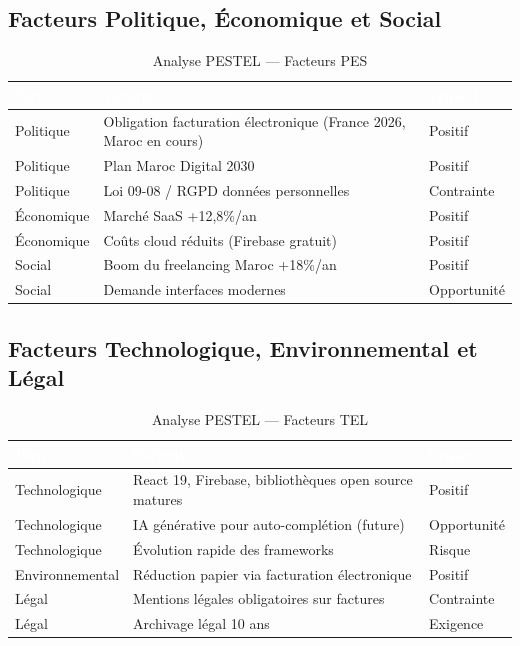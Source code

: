 \subsection{Facteurs Politique, Économique et Social}

\begin{table}[H]
\centering
\caption{Analyse PESTEL — Facteurs PES}
\label{tab:pestel_pes}
\begin{tabularx}{\textwidth}{|l|X|l|}
\hline
\rowcolor{emsiblue}\textcolor{white}{\textbf{Dim.}} & \textcolor{white}{\textbf{Facteur}} & \textcolor{white}{\textbf{Impact}} \\
\hline
Politique & Obligation facturation électronique (France 2026, Maroc en cours) & Positif \\
Politique & Plan Maroc Digital 2030 & Positif \\
Politique & Loi 09-08 / RGPD données personnelles & Contrainte \\
Économique & Marché SaaS +12,8\%/an & Positif \\
Économique & Coûts cloud réduits (Firebase gratuit) & Positif \\
Social & Boom du freelancing Maroc +18\%/an & Positif \\
Social & Demande interfaces modernes & Opportunité \\
\hline
\end{tabularx}
\end{table}

\subsection{Facteurs Technologique, Environnemental et Légal}

\begin{table}[H]
\centering
\caption{Analyse PESTEL — Facteurs TEL}
\label{tab:pestel_tel}
\begin{tabularx}{\textwidth}{|l|X|l|}
\hline
\rowcolor{emsiblue}\textcolor{white}{\textbf{Dim.}} & \textcolor{white}{\textbf{Facteur}} & \textcolor{white}{\textbf{Impact}} \\
\hline
Technologique & React 19, Firebase, bibliothèques open source matures & Positif \\
Technologique & IA générative pour auto-complétion (future) & Opportunité \\
Technologique & Évolution rapide des frameworks & Risque \\
Environnemental & Réduction papier via facturation électronique & Positif \\
Légal & Mentions légales obligatoires sur factures & Contrainte \\
Légal & Archivage légal 10 ans & Exigence \\
\hline
\end{tabularx}
\end{table}

